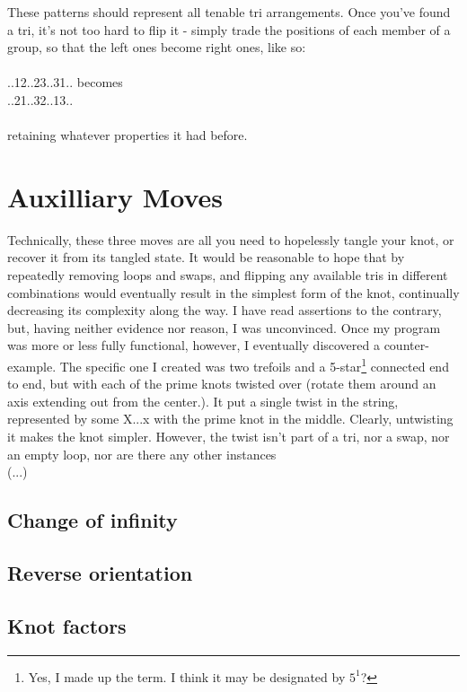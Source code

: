 \documentclass[twoside]{report}
\begin{document}
These patterns should represent all tenable tri arrangements.  Once you've found a tri, it's not too hard to flip it - simply trade the positions of each member of a group, so that the left ones become right ones, like so:\\\\
..12..23..31.. becomes\\
..21..32..13..\\\\
retaining whatever properties it had before.

\section{Auxilliary Moves}
Technically, these three moves are all you need to hopelessly tangle your knot, or recover it from its tangled state.  It would be reasonable to hope that by repeatedly removing loops and swaps, and flipping any available tris in different combinations would eventually result in the simplest form of the knot, continually decreasing its complexity along the way.  I have read assertions to the contrary, but, having neither evidence nor reason, I was unconvinced.  Once my program was more or less fully functional, however, I eventually discovered a counter-example.  The specific one I created was two trefoils and a 5-star\footnote{Yes, I made up the term.  I think it may be designated by $5^1$?} connected end to end, but with each of the prime knots twisted over (rotate them around an axis extending out from the center.).  It put a single twist in the string, represented by some X...x with the prime knot in the middle.  Clearly, untwisting it makes the knot simpler.  However, the twist isn't part of a tri, nor a swap, nor an empty loop, nor are there any other instances \\
(...)\\
\subsection{Change of infinity}
\subsection{Reverse orientation}
\subsection{Knot factors}
\end{document}
